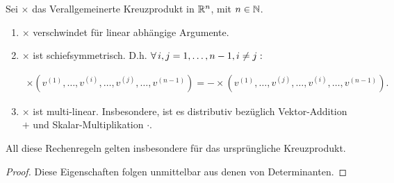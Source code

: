 \begin{lemma*}

Sei $\times$ das Verallgemeinerte Kreuzprodukt in $\mathbb{R}^n$, mit $n \in \mathbb{N}$.

\begin{enumerate}

  \item
  $\times$ verschwindet für linear abhängige Argumente.

  \item
  $\times$ ist schiefsymmetrisch.
  D.h. $\forall \, i, j = 1, \ldots, n-1, i \neq j:$

  \begin{align*}
    \times(v^{(1)}, \ldots, v^{(i)}, \ldots, v^{(j)}, \ldots, v^{(n-1)})
    =
    -
    \times(v^{(1)}, \ldots, v^{(j)}, \ldots, v^{(i)}, \ldots, v^{(n-1)}).
  \end{align*}

  \item
  $\times$ ist multi-linear.
  Insbesondere, ist es distributiv bezüglich Vektor-Addition $+$ und Skalar-Multiplikation $\cdot$.

\end{enumerate}

All diese Rechenregeln gelten insbesondere für das ursprüngliche Kreuzprodukt.

\end{lemma*}

\begin{proof}

Diese Eigenschaften folgen unmittelbar aus denen von Determinanten.

\end{proof}
